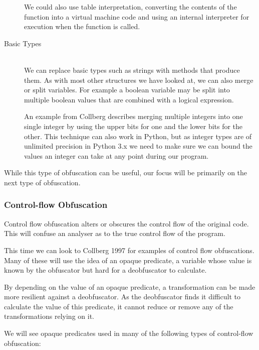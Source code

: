 \documentclass[twoside,a4paper]{report}
\begin{document}
\begin{description}
We could also use table interpretation, converting the contents of the function into a virtual machine code and using an internal
interpreter for execution when the function is called.

\item[Basic Types] \hfill \\
We can replace basic types such as strings with methods that produce them. As with most other structures we have looked at, we can
also merge or split variables. For example a boolean variable may be split into multiple boolean values that are combined with a
logical expression.

An example from Collberg describes merging multiple integers into one single integer by using the upper bits for one and the lower
bits for the other. This technique can also work in Python, but as integer types are of unlimited precision \cite{intprec} in Python
3.x we need to make sure we can bound the values an integer can take at any point during our program.

\end{description}

While this type of obfuscation can be useful, our focus will be primarily on the next type of obfuscation.

\subsubsection{Control-flow Obfuscation}

Control flow obfuscation alters or obscures the control flow of the original code. This will confuse an analyser as to the
true control flow of the program.

This time we can look to Collberg 1997 \cite{taxobftrans} for examples of control flow obfuscations. Many of these will use the idea
of an opaque predicate, a variable whose value is known by the obfuscator but hard for a deobfuscator to calculate.

By depending on the value of an opaque predicate, a transformation can be made more resilient against a deobfuscator. As the
deobfuscator finds it difficult to calculate the value of this predicate, it cannot reduce or remove any of the transformations relying
on it.

We will see opaque predicates used in many of the following types of control-flow obfuscation:
\end{document}
